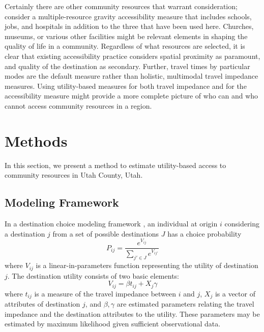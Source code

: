 \documentclass[ijerph,article,submit,moreauthors,pdftex]{mdpi}
\begin{document}
Certainly there are other community resources that warrant consideration;
\citet{ermagun2020} consider a multiple-resource gravity accessibility measure that
includes schools, jobs, and hospitals in addition to the three that have been used here.
Churches, museums, or various other facilities might be relevant elements
in shaping the quality of life in a community. Regardless of what resources
are selected, it is clear that existing accessibility practice considers spatial
proximity as paramount, and quality of the destination as secondary. Further,
travel times by particular modes are the default measure rather than holistic,
multimodal travel impedance measures. Using utility-based measures for both
travel impedance and for the accessibility measure might provide a more
complete picture of who can and who cannot access community resources in a region.

\hypertarget{methods}{%
\section{Methods}\label{methods}}

In this section, we present a method to estimate utility-based access to
community resources in Utah County, Utah.

\hypertarget{framework}{%
\subsection{Modeling Framework}\label{framework}}

In a destination choice modeling framework \citep{recker1978}, an individual
at origin \(i\) considering a destination \(j\) from a set of possible destinations
\(J\) has a choice probability
\begin{equation}
P_{ij} = \frac{e^{V_{ij}}}{\sum_{j' \in J} e^{V_{ij'}}}
  \label{eq:mnlp}
\end{equation}
where \(V_{ij}\) is a linear-in-parameters function representing the utility of
destination \(j\). The destination utility consists of two basic elements:
\begin{equation}
 V_{ij} = \beta t_{ij} + X_j\gamma 
  \label{eq:dcu}
\end{equation}
where \(t_{ij}\) is a measure of the travel impedance between \(i\) and \(j\), \(X_j\)
is a vector of attributes of destination \(j\), and \(\beta, \gamma\) are estimated
parameters relating the travel impedance and the destination attributes to the
utility. These parameters may be estimated by maximum likelihood given sufficient
observational data.
\end{document}
